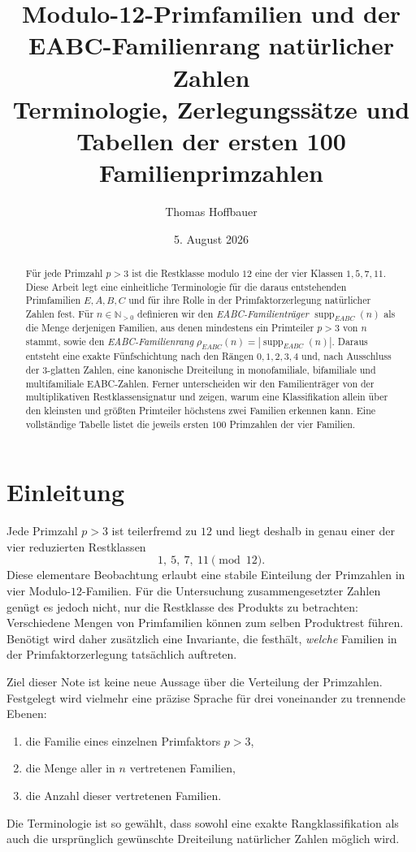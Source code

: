 \documentclass[11pt,a4paper,reqno]{amsart}
\title[Modulo-12-Primfamilien und EABC-Familienrang]{Modulo-12-Primfamilien und der EABC-Familienrang natürlicher Zahlen\\
Terminologie, Zerlegungssätze und Tabellen der ersten 100 Familienprimzahlen}
\author{Thomas Hoffbauer}
\date{5. August 2026}
\theoremstyle{definition}
\theoremstyle{remark}
\newcommand{\Npos}{\mathbb{N}_{>0}}
\newcommand{\suppE}{\operatorname{supp}_{EABC}}
\newcommand{\rankE}{\rho_{EABC}}
\begin{document}
\begin{abstract}
Für jede Primzahl $p>3$ ist die Restklasse modulo $12$ eine der vier Klassen $1,5,7,11$. Diese Arbeit legt eine einheitliche Terminologie für die daraus entstehenden Primfamilien $E,A,B,C$ und für ihre Rolle in der Primfaktorzerlegung natürlicher Zahlen fest. Für $n\in\Npos$ definieren wir den \emph{EABC-Familienträger} $\suppE(n)$ als die Menge derjenigen Familien, aus denen mindestens ein Primteiler $p>3$ von $n$ stammt, sowie den \emph{EABC-Familienrang} $\rankE(n)=|\suppE(n)|$. Daraus entsteht eine exakte Fünfschichtung nach den Rängen $0,1,2,3,4$ und, nach Ausschluss der $3$-glatten Zahlen, eine kanonische Dreiteilung in monofamiliale, bifamiliale und multifamiliale EABC-Zahlen. Ferner unterscheiden wir den Familienträger von der multiplikativen Restklassensignatur und zeigen, warum eine Klassifikation allein über den kleinsten und größten Primteiler höchstens zwei Familien erkennen kann. Eine vollständige Tabelle listet die jeweils ersten $100$ Primzahlen der vier Familien.
\end{abstract}

\maketitle

\section{Einleitung}

Jede Primzahl $p>3$ ist teilerfremd zu $12$ und liegt deshalb in genau einer der vier reduzierten Restklassen
\[
1,\ 5,\ 7,\ 11 \pmod{12}.
\]
Diese elementare Beobachtung erlaubt eine stabile Einteilung der Primzahlen in vier Modulo-$12$-Familien. Für die Untersuchung zusammengesetzter Zahlen genügt es jedoch nicht, nur die Restklasse des Produkts zu betrachten: Verschiedene Mengen von Primfamilien können zum selben Produktrest führen. Benötigt wird daher zusätzlich eine Invariante, die festhält, \emph{welche} Familien in der Primfaktorzerlegung tatsächlich auftreten.

Ziel dieser Note ist keine neue Aussage über die Verteilung der Primzahlen. Festgelegt wird vielmehr eine präzise Sprache für drei voneinander zu trennende Ebenen:
\begin{enumerate}[label=(\roman*)]
    \item die Familie eines einzelnen Primfaktors $p>3$,
    \item die Menge aller in $n$ vertretenen Familien,
    \item die Anzahl dieser vertretenen Familien.
\end{enumerate}
Die Terminologie ist so gewählt, dass sowohl eine exakte Rangklassifikation als auch die ursprünglich gewünschte Dreiteilung natürlicher Zahlen möglich wird.
\end{document}
